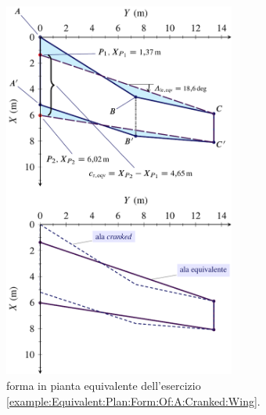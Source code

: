 \documentclass[[12pt,twoside]{book}
\begin{document}
\begin{figure}[t]%
  \centering
    \includegraphics[width=0.68\textwidth]{Chapter_2/equivalent_plan_form_of_a_cranked_wing/wing_planform_basic_3_drawing.pdf}
  \caption{
           forma in pianta equivalente dell'esercizio \ref{example:Equivalent:Plan:Form:Of:A:Cranked:Wing}.
  }
  \label{fig:Cranked:Wing:Planform:Results:B}%
\end{figure}
\end{document}
